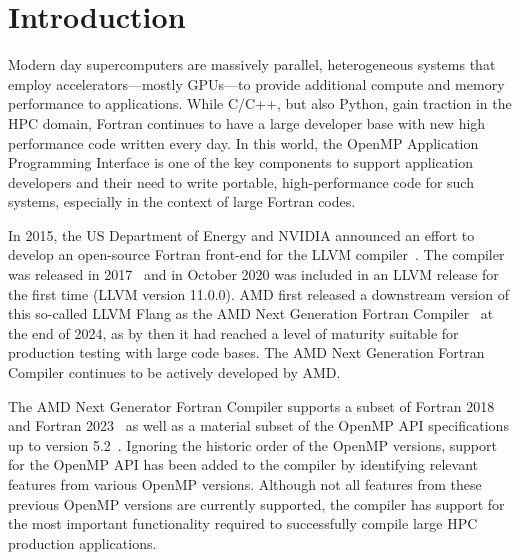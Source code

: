 \documentclass[acmtog,natbib=false]{acmart}
\begin{document}


\maketitle


\acresetall
\section{Introduction}
\label{sec:Introduction}

Modern day supercomputers are massively parallel, heterogeneous systems that employ accelerators---mostly \acp{GPU}---to provide additional compute and memory performance to applications.
While C/C++, but also Python, gain traction in the \ac{HPC} domain, Fortran continues to have a large developer base with new high performance code written every day.
In this world, the OpenMP Application Programming Interface is one of the key components to support application developers and their need to write portable, high-performance code for such systems, especially in the context of large Fortran codes.

In 2015, the US Department of Energy and NVIDIA announced an effort to develop an open-source Fortran front-end for the LLVM compiler~\cite{Flang-Nvidia-NNSA}.
The compiler was released in 2017~\cite{Pric17} and in October 2020 was included in an LLVM release for the first time (LLVM version 11.0.0).
AMD first released a downstream version of this so-called LLVM Flang as the AMD Next Generation Fortran Compiler~\cite{AMD24} at the end of 2024, as by then it had reached a level of maturity suitable for production testing with large code bases. The AMD Next Generation Fortran Compiler continues to be actively developed by AMD.

The AMD Next Generator Fortran Compiler supports a subset of Fortran 2018~\cite{F2018} and Fortran 2023~\cite{F2023} as well as a material subset of the OpenMP \ac{API} specifications up to version 5.2~\cite{OARB21}.
Ignoring the historic order of the OpenMP versions, support for the OpenMP \ac{API} has been added to the compiler by identifying relevant features from various OpenMP versions.
Although not all features from these previous OpenMP versions are currently supported, the compiler has support for the most important functionality required to successfully compile large \ac{HPC} production applications.
\end{document}
